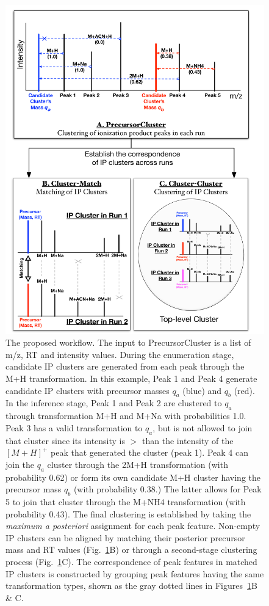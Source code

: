 \begin{figure}[!htbp]
\centering
\includegraphics[width=0.75\linewidth]{05-precursor-cluster/figures/fig1.pdf}
\caption{\label{fig:01} The proposed workflow. The input to PrecursorCluster is a list of m/z, RT and intensity values. During the enumeration stage, candidate IP clusters are generated from each peak through the M+H transformation. In this example, Peak 1 and Peak 4 generate candidate IP clusters with precursor masses $q_a$ (blue) and $q_b$ (red). In the inference stage, Peak 1 and Peak 2 are clustered to $q_a$ through transformation M+H and M+Na with probabilities 1.0. Peak 3 has a valid transformation to $q_a$, but is not allowed to join that cluster since its intensity is $>$ than the intensity of the $[M+H]^+$ peak that generated the cluster (peak 1). Peak 4 can join the $q_a$ cluster through the 2M+H transformation (with probability 0.62) or form its own candidate M+H cluster having the precursor mass $q_b$ (with probability 0.38.) The latter allows for Peak 5 to join that cluster through the M+NH4 transformation (with probability 0.43). The final clustering is established by taking the \textit{maximum a posteriori} assignment for each peak feature. Non-empty IP clusters can be aligned by matching their posterior precursor mass and RT values (Fig.~\ref{fig:01}B) or through a second-stage clustering process (Fig.~\ref{fig:01}C). The correspondence of peak features in matched IP clusters is constructed by grouping peak features having the same transformation types, shown as the gray dotted lines in Figures~\ref{fig:01}B \& C.}
\end{figure}

